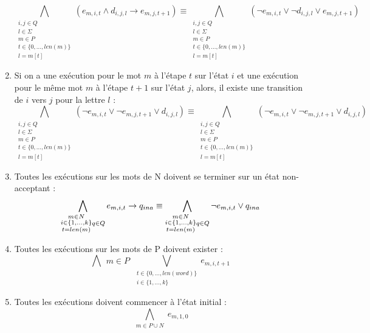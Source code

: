 \documentclass[a4paper, 12pt]{extarticle}
\begin{document}
\begin{enumerate}
\begin{equation*}
        \bigwedge_{\substack{i,j \in Q\\l \in \Sigma\\m \in P\\t \in \{0,\dots,len(m)\}\\l=m[t]}} (e_{m,i,t} \wedge d_{i,j,l} \rightarrow e_{m,j,t+1}) \equiv
        \bigwedge_{\substack{i,j \in Q\\l \in \Sigma\\m \in P\\t \in \{0,\dots,len(m)\}\\l=m[t]}} (\neg e_{m,i,t} \vee \neg d_{i,j,l} \vee e_{m,j,t+1})
    \end{equation*}
    \item Si on a une exécution pour le mot $m$ à l'étape $t$ sur l'état $i$ et une exécution pour le même mot $m$ à l'étape $t+1$ sur l'état $j$,
    alors, il existe une transition de $i$ vers $j$ pour la lettre $l$ :
    \begin{equation*}
        \bigwedge_{\substack{i,j \in Q\\l \in \Sigma\\m \in P\\t \in \{0,\dots,len(m)\}\\l=m[t]}} (\neg e_{m,i,t} \vee \neg e_{m,j,t+1} \vee d_{i,j,l})\equiv
        \bigwedge_{\substack{i,j \in Q\\l \in \Sigma\\m \in P\\t \in \{0,\dots,len(m)\}\\l=m[t]}} (\neg e_{m,i,t} \vee \neg e_{m,j,t+1} \vee d_{i,j,l})
    \end{equation*}
    \item Toutes les exécutions sur les mots de N doivent se terminer sur un état non-acceptant :
    \begin{equation*}
        \bigwedge_{\substack{m \in N\\i \in \{1,\dots,k\}\\t=len(m)}\\q\in Q} e_{m,i,t} \rightarrow q_{ina}\equiv
        \bigwedge_{\substack{m \in N\\i \in \{1,\dots,k\}\\t=len(m)}\\q\in Q} \neg e_{m,i,t} \vee q_{ina}
    \end{equation*}
    \item Toutes les exécutions sur les mots de P doivent exister :
    \begin{equation*}
        \bigwedge{\substack{m\in P}}\bigvee_{\substack{t\in\{0,\dots,len(word)\}\\i\in \{1,\dots,k\}}} e_{m,i,t+1}
    \end{equation*}
    \item Toutes les exécutions doivent commencer à l'état initial :
    \begin{equation*}
        \bigwedge_{\substack{m\in P\cup N}} e_{m,1,0}
    \end{equation*}
\end{enumerate}





\end{document}
